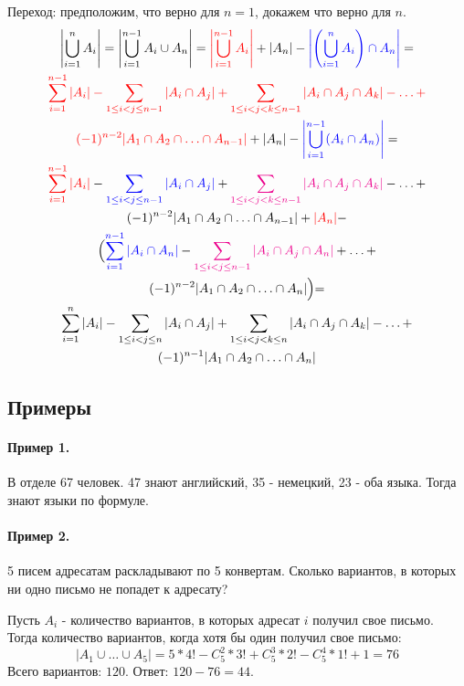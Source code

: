 \documentclass[main]{subfiles}
\begin{document}
Переход: предположим, что верно для $n = 1$, докажем что верно для $n$.
\begin{multline*}
    \left| \bigcup_{i = 1}^n A_i \right| = 
    \left| \bigcup_{i = 1}^{n-1} A_i \cup A_n \right| =
    \textcolor{red}{ \left| \bigcup_{i = 1}^{n-1} A_i \right| } + |A_n| - 
        \textcolor{blue}{ \left| \left( \bigcup_{i = 1}^n A_i \right) \cap A_n \right| } = \\
    \textcolor{red}{ \sum_{i = 1}^{n - 1} |A_i| - 
        \sum_{1 \leq i < j \leq n-1} |A_i \cap A_j| + 
        \sum_{1 \leq i < j < k \leq n-1} |A_i \cap A_j \cap A_k| -
        \ldots + } \\
        \textcolor{red}{ (-1)^{n-2} |A_1 \cap A_2 \cap \ldots \cap A_{n-1}| } + 
        |A_n| - 
        \textcolor{blue}{ \left| \bigcup_{i = 1}^{n - 1} (A_i \cap A_n) \right| } = \\
    \textcolor{red}{\sum_{i = 1}^{n - 1} |A_i|} - 
        \textcolor{blue}{ \sum_{1 \leq i < j \leq n-1} |A_i \cap A_j| } + 
        \textcolor{magenta}{ \sum_{1 \leq i < j < k \leq n-1} |A_i \cap A_j \cap A_k| } -
        \ldots + \\
        (-1)^{n-2} |A_1 \cap A_2 \cap \ldots \cap A_{n-1}| + 
        \textcolor{red}{|A_n|} - \\
        \Bigl(\textcolor{blue}{ \sum_{i = 1}^{n - 1} |A_i \cap A_n| } - 
            \textcolor{magenta}{ \sum_{1 \leq i < j \leq n-1} |A_i \cap A_j \cap A_n| } +
            \ldots + \\ 
            (-1)^{n-2} |A_1 \cap A_2 \cap \ldots \cap A_{n}| \Bigl) = \\
    \sum_{i = 1}^{n} |A_i| - 
        \sum_{1 \leq i < j \leq n} |A_i \cap A_j| + 
        \sum_{1 \leq i < j < k \leq n} |A_i \cap A_j \cap A_k| -
        \ldots + \\
        (-1)^{n-1} |A_1 \cap A_2 \cap \ldots \cap A_n|
\end{multline*}

\subsection{Примеры}
\paragraph{Пример 1.}
В отделе 67 человек. 47 знают английский, 35 - немецкий, 23 - оба языка. Тогда знают 
языки по формуле.

\paragraph{Пример 2.}
5 писем адресатам раскладывают по 5 конвертам. Сколько вариантов, в которых ни одно письмо
не попадет к адресату?

Пусть $A_i$ - количество вариантов, в которых адресат $i$ получил свое письмо. Тогда 
количество вариантов, когда хотя бы один получил свое письмо:
\[
    |A_1 \cup \ldots \cup A_5| = 5 * 4! - C_5^2 * 3! + C_5^3 * 2! - C_5^4 * 1! + 1 = 76
\]
Всего вариантов: $120$. Ответ: $120 - 76 = 44$.
\end{document}
